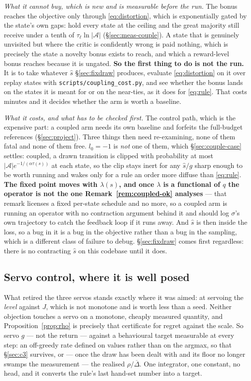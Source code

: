 \documentclass{article}
\newcommand{\actions}{\mathcal{A}}
\newcommand{\gapbar}{\overline{\Delta}}
\newcommand{\srank}{\sigma}
\begin{document}
\emph{What it cannot buy, which is new and is measurable before the run.} The bonus reaches the
objective only through \eqref{eq:distortion}, which is exponentially gated by the state's own
gaps: hold every state at the ceiling and the great majority still receive under a tenth of
$\tau_\ell\ln|\actions|$ (\S\ref{sec:meas-couple}). A state that is genuinely unvisited
but where the critic is confidently wrong is paid nothing, which is precisely the state a novelty
bonus exists to reach, and which a reward-level bonus reaches because it is ungated.
\textbf{So the first thing to do is not the run.} It is to take whatever $\hat{s}$
\S\ref{sec:fixdraw} produces, evaluate \eqref{eq:distortion} on it over replay states with
\texttt{scripts/coupling\_cost.py}, and see whether the bonus lands on the states it is meant for
or on the near-ties, as it does for \eqref{eq:rule}. That costs minutes and it decides whether
the arm is worth a baseline.

\emph{What it costs, and what has to be checked first.} The control path, which is the expensive
part: a coupled arm needs its own baseline and forfeits the full-budget references
(\S\ref{sec:project}). Three things then need re-examining, none of them fatal and none of them
free. $l_0 = -1$ is \emph{not} one of them, which \S\ref{sec:couple-case} settles: coupled, a
drawn transition is clipped with probability at most $|\actions|e^{-1/(\alpha\tau(s))}$ at each
state, so the clip stays inert for any $\hat{s}/g$ sharp enough to be worth running and wakes
only for a rule an order more diffuse than \eqref{eq:rule}.
\textbf{The fixed point moves with $\lambda(s)$, and once
$\lambda$ is a functional of $q$ the operator is not the one
Remark~\ref{rem:coupled-ok} analyses} --- that remark licenses a fixed per-state schedule and no
more, so a coupled arm is running an operator with no contraction argument behind it and should
log $\srank$'s own trajectory to catch the feedback loop if it runs away. And $\hat{s}$ is then
inside the loss, so a bug in it is a bug in the objective rather than a bug in the sampling,
which is a different class of failure to debug. \S\ref{sec:fixdraw} comes first regardless: there is no
contracting $\hat{s}$ on this codebase until it does.

\subsection{Servo control, where it is well posed}
\label{sec:servo}

What retired the three servos stands exactly where it was aimed: at servoing the \emph{level}
against $J$, which is not monotone and is worth less than a seed. Neither objection touches a
servo on a monotone, cheaply measured quantity, and Proposition~\ref{prop:rho} is precisely that
certificate for regret against the scale. So servo $g$ --- not the return --- against a
behavioural target measurable at every step: an off-greedy rate defined on values rather than on
the argmax, so that \S\ref{sec:c3} survives, or --- once the draw has been dealt with and its
floor no longer swamps the measurement --- the realised $\rho/\gapbar$. One integrator, one
constant, no head, and it converts the rule's last hand-set number into a target.
\end{document}
